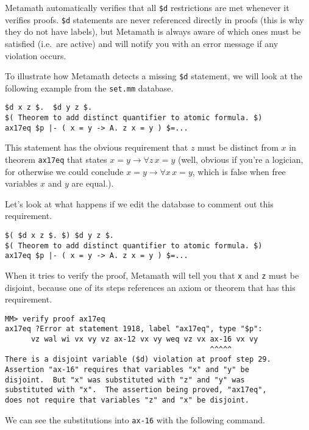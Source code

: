 Metamath automatically verifies that all \texttt{\$d}
restrictions are met whenever it verifies proofs.  \texttt{\$d} statements are
never referenced directly in proofs (this is why they do not have
labels), but Metamath is always aware of which ones must be
satisfied (i.e.\ are active) and will notify you with an error message if any
violation occurs.

To illustrate how Metamath detects a missing \texttt{\$d}
statement, we will look at the following example from the
\texttt{set.mm} database.

\begin{verbatim}
$d x z $.  $d y z $.
$( Theorem to add distinct quantifier to atomic formula. $)
ax17eq $p |- ( x = y -> A. z x = y ) $=...
\end{verbatim}

This statement has the obvious requirement that $z$ must be
distinct from $x$ in theorem \texttt{ax17eq} that
states $x=y \rightarrow \forall z \, x=y$ (well, obvious if you're a logician,
for otherwise we could conclude  $x=y \rightarrow \forall x \, x=y$, which is
false when free variables $x$ and $y$ are equal.).

Let's look at what happens if we edit the database to comment out this
requirement.

\begin{verbatim}
$( $d x z $. $) $d y z $.
$( Theorem to add distinct quantifier to atomic formula. $)
ax17eq $p |- ( x = y -> A. z x = y ) $=...
\end{verbatim}

When it tries to verify the proof, Metamath will tell you that \texttt{x} and
\texttt{z} must be disjoint, because one of its steps references an axiom or
theorem that has this requirement.

\begin{verbatim}
MM> verify proof ax17eq
ax17eq ?Error at statement 1918, label "ax17eq", type "$p":
      vz wal wi vx vy vz ax-12 vx vy weq vz vx ax-16 vx vy
                                               ^^^^^
There is a disjoint variable ($d) violation at proof step 29.
Assertion "ax-16" requires that variables "x" and "y" be
disjoint.  But "x" was substituted with "z" and "y" was
substituted with "x".  The assertion being proved, "ax17eq",
does not require that variables "z" and "x" be disjoint.
\end{verbatim}

We can see the substitutions into \texttt{ax-16} with the following command.

